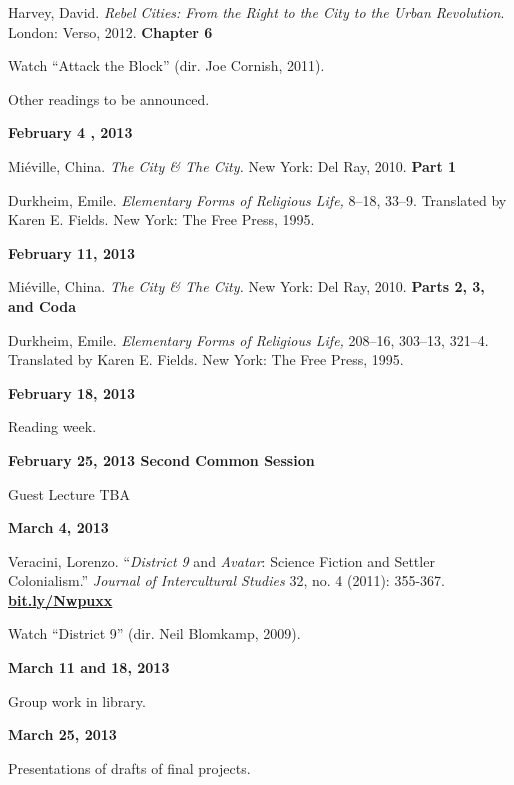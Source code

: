 \documentclass[12pt]{article}
\begin{document}
\begin{hangparas}{.5in}{1}
Harvey, David. \textit{Rebel Cities: From the Right to the City to the Urban Revolution}. London: Verso, 2012. \textbf{Chapter 6}

Watch ``Attack the Block'' (dir. Joe Cornish, 2011).

Other readings to be announced.
\end{hangparas}

\textbf{February 4 , 2013}

\begin{hangparas}{.5in}{1}
Mi\'eville, China. \textit{The City \& The City.} New York: Del Ray, 2010. \textbf{Part 1}

Durkheim, Emile. \textit{Elementary Forms of Religious Life,} 8--18, 33--9. Translated by Karen E. Fields. New York: The Free Press, 1995.
\end{hangparas}

\textbf{February 11, 2013}

\begin{hangparas}{.5in}{1}
Mi\'eville, China. \textit{The City \& The City.} New York: Del Ray, 2010. \textbf{Parts 2, 3, and Coda}

Durkheim, Emile. \textit{Elementary Forms of Religious Life,} 208--16, 303--13, 321--4. Translated by Karen E. Fields. New York: The Free Press, 1995.
\end{hangparas}

\textbf{February 18, 2013}

Reading week.

\textbf{February 25, 2013 \hspace{.125in} Second Common Session}

Guest Lecture TBA

\textbf{March 4, 2013}

\begin{hangparas}{.5in}{1}
Veracini, Lorenzo. ``\textit{District 9} and \textit{Avatar}: Science Fiction and Settler Colonialism.'' \textit{Journal of Intercultural Studies} 32, no. 4 (2011): 355-367. \href{bit.ly/Nwpuxx}{\textbf{bit.ly/Nwpuxx}}

Watch ``District 9'' (dir. Neil Blomkamp, 2009).
\end{hangparas}

\textbf{March 11 and 18, 2013}

Group work in library.

\textbf{March 25, 2013}

Presentations of drafts of final projects.
\end{document}
